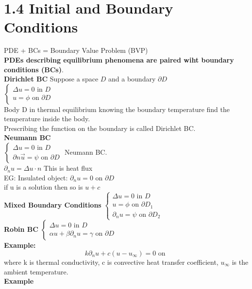 \documentclass{article}
\begin{document}
\section*{1.4 Initial and Boundary Conditions}
PDE + BCs = Boundary Value Problem (BVP)\\
\textbf{PDEs describing equilibrium phenomena are paired wiht boundary conditions (BCs)}.\\
\textbf{Dirichlet BC}
Suppose a space $D$ and a boundary $\partial D$ \\$\begin{cases}
    \Delta u = 0 \text{ in } D\\
    u = \phi \text{ on } \partial D
\end{cases}$\\
Body D in thermal equilibrium knowing the boundary temperature find the temperature inside the body.\\
Prescribing the function on the boundary is called Dirichlet BC.\\
\textbf{Neumann BC}\\
$\begin{cases}
    \Delta u = 0 \text{ in } D\\
    \partial{n}\vec{u} = \psi \text{ on } \partial D
\end{cases}$ Neumann BC.\\
$\partial_n u = \Delta u \cdot n$ This is heat flux \\
EG: Insulated object: $\partial_n u = 0 \text{ on } \partial D$\\
if u is a solution then so is $u + c$\\
\textbf{Mixed Boundary Conditions}
$\begin{cases}
    \Delta u = 0 \text{ in } D\\
    u = \phi \text{ on } \partial D_1\\
    \partial_n u = \psi \text{ on } \partial D_2
\end{cases}$\\
\textbf{Robin BC}
$\begin{cases}
    \Delta u = 0 \text{ in } D\\
    \alpha u + \beta \partial_n u = \gamma \text{ on } \partial D
\end{cases}$\\
\textbf{Example:}
$$k \partial_n u + c(u - u_\infty) = 0 \text{ on } $$
where k is thermal conductivity, c is convective heat transfer coefficient, $u_\infty$ is the ambient temperature.\\
\textbf{Example} 
\end{document}
